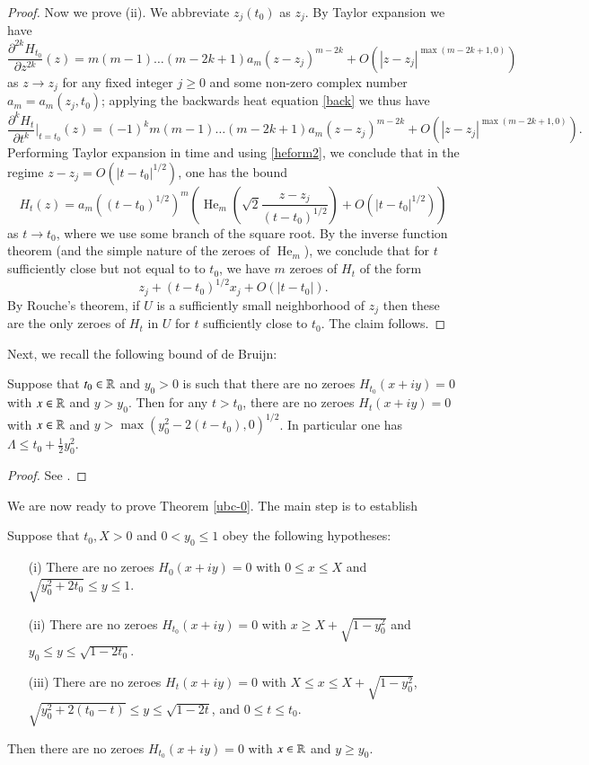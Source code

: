 \begin{proof}
Now we prove (ii).  We abbreviate $z_j(t_0)$ as $z_j$.  By Taylor expansion we have
$$ \frac{\partial^{2k} H_{t_0}}{\partial z^{2k}}(z) = m (m-1) \dots (m-2k+1) a_m (z-z_j)^{m-2k} + O( |z-z_j|^{\max(m-2k+1,0)} )$$
as $z \to z_j$ for any fixed integer $j \geq 0$ and some non-zero complex number $a_m = a_m(z_j, t_0)$; applying the backwards heat equation \eqref{back} we thus have
$$ \frac{\partial^k H_t}{\partial t^k}|_{t=t_0}(z) = (-1)^k m (m-1) \dots (m-2k+1) a_m (z-z_j)^{m-2k} + O( |z-z_j|^{\max(m-2k+1,0)} ).$$
Performing Taylor expansion in time and using \eqref{heform2}, we conclude that in the regime $z - z_j = O( |t-t_0|^{1/2} )$, one has the bound
$$ H_t(z) = a_m ((t-t_0)^{1/2})^m \left( \operatorname{He}_m\left( \sqrt{2} \frac{z-z_j}{(t-t_0)^{1/2}} \right) + O\left( |t-t_0|^{1/2} \right) \right)$$
as $t \to t_0$, where we use some branch of the square root.  By the inverse function theorem (and the simple nature of the zeroes of $\operatorname{He}_m$), we conclude that for $t$ sufficiently close but not equal to to $t_0$, we have $m$ zeroes of $H_t$ of the form
$$ z_j + (t-t_0)^{1/2} x_j + O( |t-t_0| ).$$
By Rouche's theorem, if $U$ is a sufficiently small neighborhood of $z_j$ then these are the only zeroes of $H_t$ in $U$ for $t$ sufficiently close to $t_0$.  The claim follows.
\end{proof}

Next, we recall the following bound of de Bruijn:

\begin{theorem}\label{debr-bound}  Suppose that $t_0 \in \mathbb{R}$ and $y_0 > 0$ is such that there are no zeroes $H_{t_0}(x+iy)=0$ with $x \in \mathbb{R}$ and $y > y_0$.  Then for any $t>t_0$, there are no zeroes $H_{t}(x+iy)=0$ with $x \in \mathbb{R}$ and $y > \max( y_0^2 - 2(t-t_0), 0)^{1/2}$.  In particular one has $\Lambda \leq t_0 + \frac{1}{2} y_0^2$.
\end{theorem}

\begin{proof} See \cite[Theorem 13]{debr}.
\end{proof}

We are now ready to prove Theorem \ref{ubc-0}.  The main step is to establish

\begin{proposition}\label{ubc}  Suppose that $t_0, X > 0$ and $0 < y_0 \leq 1$ obey the following hypotheses:
\begin{itemize}
\item[(i)]  There are no zeroes $H_0(x+iy)=0$ with $0 \leq x \leq X$ and $\sqrt{y_0^2+2 t_0} \leq y \leq 1$.
\item[(ii)]  There are no zeroes $H_{t_0}(x+iy)=0$ with $x \geq X+\sqrt{1-y_0^2}$ and $y_0 \leq y \leq \sqrt{1-2t_0}$.
\item[(iii)]  There are no zeroes $H_{t}(x+iy)=0$ with $X \leq x \leq X+\sqrt{1-y_0^2}$, $\sqrt{y_0^2 + 2(t_0-t)} \leq y \leq \sqrt{1-2t}$, and $0 \leq t \leq t_0$.
\end{itemize}
Then there are no zeroes $H_{t_0}(x+iy) = 0$ with $x \in \mathbb{R}$ and $y \geq y_0$.
\end{proposition}

